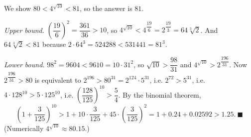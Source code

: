 We show $80<4^{\sqrt{10}}<81$, so the answer is $\boxed{81}$.

\emph{Upper bound.} $\left(\dfrac{19}{6}\right)^2=\dfrac{361}{36}>10$, so $4^{\sqrt{10}}<4^{\dfrac{19}{6}}=2^{\dfrac{19}{3}}=64\sqrt[3]2$. And $64\sqrt[3]{2}<81$ because $2\cdot64^3=524288<531441=81^3$.

\emph{Lower bound.} $98^2=9604<9610=10\cdot31^2$, so $\sqrt{10}>\dfrac{98}{31}$ and $4^{\sqrt{10}}>2^{\dfrac{196}{31}}$. Now $2^{\dfrac{196}{31}}>80$ is equivalent to $2^{196}>80^{31}=2^{124}\cdot5^{31}$, i.e. $2^{72}>5^{31}$, i.e. $4\cdot128^{10}>5\cdot125^{10}$, i.e. $\left(\dfrac{128}{125}\right)^{10}>\dfrac54$. By the binomial theorem,
\[\left(1+\dfrac{3}{125}\right)^{10}>1+10\cdot\dfrac{3}{125}+45\cdot\left(\dfrac{3}{125}\right)^2=1+0.24+0.02592>1.25.\ \blacksquare\]
(Numerically $4^{\sqrt{10}}\approx80.15$.)
